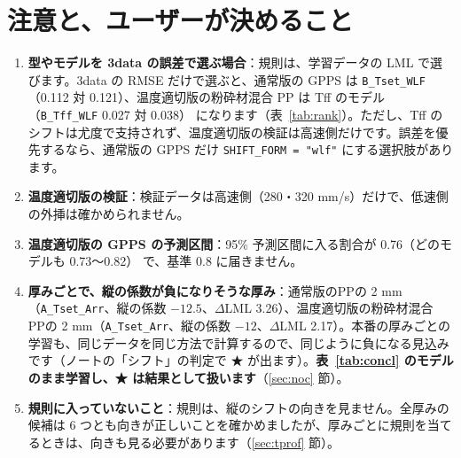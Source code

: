 \documentclass[paper=a4paper,fontsize=10.5pt,line_length=44zw,number_of_lines=40]{jlreq}
\let\origtextbf\textbf
\renewcommand{\textbf}[1]{\origtextbf{\gtfamily #1}}   %
\begin{document}
\section{注意と、ユーザーが決めること}\label{sec:note}
\begin{enumerate}[itemsep=0.5ex,topsep=0.4ex]
\item \textbf{型やモデルを 3data の誤差で選ぶ場合}：規則は、学習データの LML で選びます。3data の RMSE だけで選ぶと、通常版の GPPS は \texttt{B\_\allowbreak{}Tset\_\allowbreak{}WLF}（0.112 対 0.121）、温度適切版の粉砕材混合 PP は Tff のモデル（\texttt{B\_\allowbreak{}Tff\_\allowbreak{}WLF} 0.027 対 0.038） になります（表~\ref{tab:rank}）。ただし、Tff のシフトは尤度で支持されず、温度適切版の検証は高速側だけです。誤差を優先するなら、通常版の GPPS だけ \texttt{SHIFT\_\allowbreak{}FORM = "wlf"} にする選択肢があります。
\item \textbf{温度適切版の検証}：検証データは高速側（280・320 mm/s）だけで、低速側の外挿は確かめられません。
\item \textbf{温度適切版の GPPS の予測区間}：95\% 予測区間に入る割合が 0.76（どのモデルも 0.73〜0.82） で、基準 0.8 に届きません。
\item \textbf{厚みごとで、縦の係数が負になりそうな厚み}：通常版のPPの 2 mm（\texttt{A\_\allowbreak{}Tset\_\allowbreak{}Arr}、縦の係数 $-12.5$、$\Delta$LML 3.26）、温度適切版の粉砕材混合 PPの 2 mm（\texttt{A\_\allowbreak{}Tset\_\allowbreak{}Arr}、縦の係数 $-12$、$\Delta$LML 2.17）。本番の厚みごとの学習も、同じデータを同じ方法で計算するので、同じように負になる見込みです（ノートの「シフト」の判定で ★ が出ます）。\textbf{表~\ref{tab:concl} のモデルのまま学習し、★ は結果として扱います}（\ref{sec:noc} 節）。
\item \textbf{規則に入っていないこと}：規則は、縦のシフトの向きを見ません。全厚みの候補は 6 つとも向きが正しいことを確かめましたが、厚みごとに規則を当てるときは、向きも見る必要があります（\ref{sec:tprof} 節）。
\end{enumerate}
\end{document}
